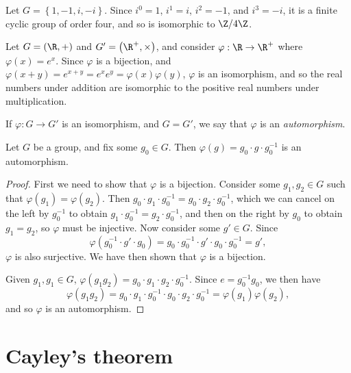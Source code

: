 \documentclass[12pt]{article}
\begin{document}
\begin{exmp}
    Let $G = \left\{1, -1, i, -i\right\}$. Since $i^0 = 1$, $i^1 = i$, $i^2 = -1$, and $i^3 = -i$, it is a finite cyclic group of order four, and so is isomorphic to $\Z/4\Z$.
\end{exmp}

\begin{exmp}
    Let $G = \left(\R, +\right)$ and $G' = \left(\R^+, \times\right)$, and consider $\varphi: \R \to \R^+$ where $\varphi(x) = e^x$. Since $\varphi$ is a bijection, and $\varphi(x + y) = e^{x+y} = e^xe^y = \varphi(x)\varphi(y)$, $\varphi$ is an isomorphism, and so the real numbers under addition are isomorphic to the positive real numbers under multiplication.
\end{exmp}

\begin{defn}
    If $\varphi: G \to G'$ is an isomorphism, and $G = G'$, we say that $\varphi$ is an \emph{automorphism}.
\end{defn}

\begin{prop}
    Let $G$ be a group, and fix some $g_0 \in G$. Then $\varphi(g) = g_0 \cdot g \cdot g_0^{-1}$ is an automorphism.
\end{prop}

\begin{proof}
    First we need to show that $\varphi$ is a bijection. Consider some $g_1, g_2 \in G$ such that $\varphi(g_1) = \varphi(g_2)$. Then $g_0 \cdot g_1 \cdot g_0^{-1} = g_0 \cdot g_2 \cdot g_0^{-1}$, which we can cancel on the left by $g_0^{-1}$ to obtain $g_1 \cdot g_0^{-1} = g_2 \cdot g_0^{-1}$, and then on the right by $g_0$ to obtain $g_1 = g_2$, so $\varphi$ must be injective. Now consider some $g' \in G$. Since \[\varphi(g_0^{-1} \cdot g' \cdot g_0) = g_0 \cdot g_0^{-1} \cdot g' \cdot g_0 \cdot g_0^{-1} = g',\] $\varphi$ is also surjective. We have then shown that $\varphi$ is a bijection.

    Given $g_1, g_1 \in G$, $\varphi(g_1g_2) = g_0 \cdot g_1 \cdot g_2 \cdot g_0^{-1}$. Since $e = g_0^{-1}g_0$, we then have
    \[\varphi(g_1g_2) = g_0 \cdot g_1 \cdot g_0^{-1} \cdot g_0 \cdot g_2 \cdot g_0^{-1} = \varphi(g_1)\varphi(g_2),\] and so $\varphi$ is an automorphism.
\end{proof}

\section{Cayley's theorem}
\end{document}
